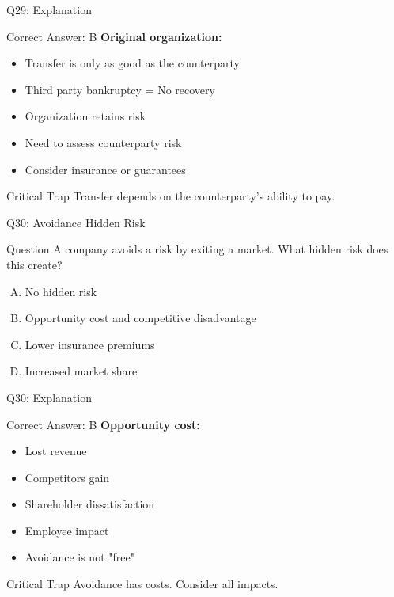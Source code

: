 \documentclass{beamer}
\begin{document}
			\begin{frame}{Q29: Explanation}
				\begin{block}{Correct Answer: B}
					\textbf{Original organization:}
					\begin{itemize}
						\item Transfer is only as good as the counterparty
						\item Third party bankruptcy = No recovery
						\item Organization retains risk
						\item Need to assess counterparty risk
						\item Consider insurance or guarantees
					\end{itemize}
				\end{block}
				\begin{alertblock}{Critical Trap}
					Transfer depends on the counterparty's ability to pay.
				\end{alertblock}
			\end{frame}
			
			\begin{frame}{Q30: Avoidance Hidden Risk}
				\begin{block}{Question}
					A company avoids a risk by exiting a market. What hidden risk does this create?
				\end{block}
				\begin{enumerate}[(A)]
					\item No hidden risk
					\item Opportunity cost and competitive disadvantage
					\item Lower insurance premiums
					\item Increased market share
				\end{enumerate}
			\end{frame}
			
			\begin{frame}{Q30: Explanation}
				\begin{block}{Correct Answer: B}
					\textbf{Opportunity cost:}
					\begin{itemize}
						\item Lost revenue
						\item Competitors gain
						\item Shareholder dissatisfaction
						\item Employee impact
						\item Avoidance is not "free"
					\end{itemize}
				\end{block}
				\begin{alertblock}{Critical Trap}
					Avoidance has costs. Consider all impacts.
				\end{alertblock}
			\end{frame}
			
\end{document}
